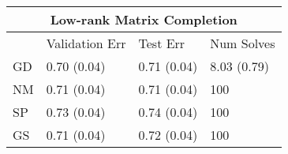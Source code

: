 \documentclass[12pt,letterpaper]{article}
\begin{document}
\begin{table}
	\begin{tabular}{| l | l | l | l |}
		\hline
		\multicolumn{4}{|c|}{Low-rank Matrix Completion}\\
		\hline
		& Validation Err & Test Err &  Num Solves\\
		\hline
		GD  & 0.70 (0.04) &  0.71 (0.04) & 8.03 (0.79) \\
		\hline
		NM & 0.71 (0.04) & 0.71 (0.04) & 100 \\
		\hline
		SP & 0.73 (0.04) & 0.74 (0.04) & 100\\
		\hline
		GS & 0.71 (0.04) & 0.72 (0.04) & 100\\
		\hline
	\end{tabular}
	
\end{table}

%
\end{document}
